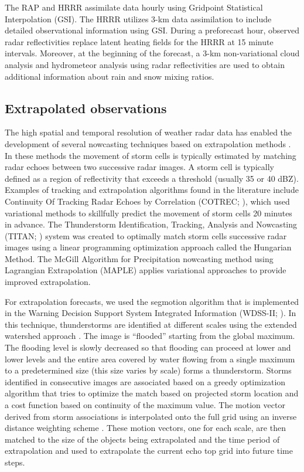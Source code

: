 \documentclass[12pt]{article}
\begin{document}
The RAP and HRRR assimilate data hourly using Gridpoint Statistical Interpolation (GSI). The HRRR utilizes 3-km data assimilation to include detailed observational information using GSI. During a preforecast hour, observed radar reflectivities replace latent heating fields for the HRRR at 15 minute intervals. Moreover, at the beginning of the forecast, a 3-km non-variational cloud analysis and hydrometeor analysis using radar reflectivities are used to obtain additional information about rain and snow mixing ratios. 

\subsection{Extrapolated observations }

The high spatial and temporal resolution of weather radar data has enabled the development of several nowcasting techniques based on extrapolation methods \citep{manda++12}. In these methods the movement of storm cells is typically estimated by matching radar echoes between two successive radar images. A storm cell is typically defined as a region of reflectivity that exceeds a threshold (usually 35 or 40 dBZ). Examples of tracking and extrapolation algorithms found in the literature include Continuity Of Tracking Radar Echoes by Correlation (COTREC; \citealt{li95}), which used variational methods \citep{sasaki58, sasaki70} to skillfully predict the movement of storm cells 20 minutes in advance. The Thunderstorm Identification, Tracking, Analysis and Nowcasting (TITAN; \citealt{dixon93}) system was created to optimally match storm cells successive radar images using a linear programming optimization approach called the Hungarian Method. The McGill Algorithm for Precipitation nowcasting method using Lagrangian Extrapolation (MAPLE) \citep{germann02, germann04} applies variational approaches to provide improved extrapolation. 

For extrapolation forecasts, we used the segmotion algorithm that is implemented in the Warning Decision Support System Integrated Information (WDSS-II; \citealt{lak++06}). 
In this technique, thunderstorms are identified at different scales using the extended watershed approach \citep{lak09eff}. The image is ``flooded'' starting from the global maximum. The flooding level is slowly decreased so that flooding can proceed at lower and lower levels and the entire area covered by water flowing from a single maximum to a predetermined size (this size varies by scale) forms a thunderstorm. Storms identified in consecutive images are associated based on a greedy optimization algorithm \citep{lak10object} that tries to optimize the match based on projected storm location and a cost function based on continuity of the maximum value. The motion vector derived from storm associations is interpolated onto the full grid using an inverse distance weighting scheme \citep{lak++03}. These motion vectors, one for each scale, are then matched to the size of the objects being extrapolated and the time period of extrapolation and used to extrapolate the current echo top grid into future time steps.
\end{document}
